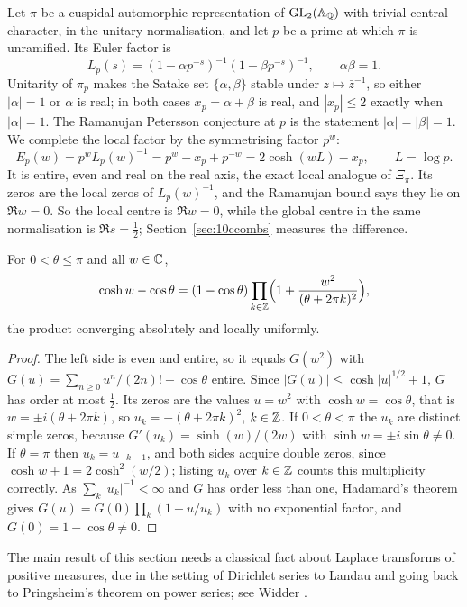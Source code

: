 Let $\pi$ be a cuspidal automorphic representation of $\mathrm{GL}_2(\mathbb{A}_{\mathbb{Q}})$ with trivial central character, in the unitary normalisation, and let $p$ be a prime at which $\pi$ is unramified. Its Euler factor is
\[
L_p(s)=(1-\alpha p^{-s})^{-1}(1-\beta p^{-s})^{-1},\qquad \alpha\beta=1 .
\]
Unitarity of $\pi_p$ makes the Satake set $\{\alpha,\beta\}$ stable under $z\mapsto\bar z^{-1}$, so either $|\alpha|=1$ or $\alpha$ is real; in both cases $x_p=\alpha+\beta$ is real, and $|x_p|\le2$ exactly when $|\alpha|=1$. The Ramanujan Petersson conjecture at $p$ is the statement $|\alpha|=|\beta|=1$. We complete the local factor by the symmetrising factor $p^w$:
\[
E_p(w)=p^{w}L_p(w)^{-1}=p^w-x_p+p^{-w}=2\cosh(wL)-x_p,\qquad L=\log p .
\]
It is entire, even and real on the real axis, the exact local analogue of $\Xi_\pi$. Its zeros are the local zeros of $L_p(w)^{-1}$, and the Ramanujan bound says they lie on $\Re w=0$. So the local centre is $\Re w=0$, while the global centre in the same normalisation is $\Re s=\frac12$; Section~\ref{sec:10ccombs} measures the difference.

\begin{lemma}\label{lem:10cproduct}
For $0<\theta\le\pi$ and all $w\in\mathbb{C}$,
\[
\cosh w-\cos\theta=(1-\cos\theta)\prod_{k\in\mathbb{Z}}\Bigl(1+\frac{w^2}{(\theta+2\pi k)^2}\Bigr),
\]
the product converging absolutely and locally uniformly.
\end{lemma}

\begin{proof}
The left side is even and entire, so it equals $G(w^2)$ with $G(u)=\sum_{n\ge0}u^n/(2n)!-\cos\theta$ entire. Since $|G(u)|\le\cosh|u|^{1/2}+1$, $G$ has order at most $\frac12$. Its zeros are the values $u=w^2$ with $\cosh w=\cos\theta$, that is $w=\pm i(\theta+2\pi k)$, so $u_k=-(\theta+2\pi k)^2$, $k\in\mathbb{Z}$. If $0<\theta<\pi$ the $u_k$ are distinct simple zeros, because $G'(u_k)=\sinh(w)/(2w)$ with $\sinh w=\pm i\sin\theta\ne0$. If $\theta=\pi$ then $u_k=u_{-k-1}$, and both sides acquire double zeros, since $\cosh w+1=2\cosh^2(w/2)$; listing $u_k$ over $k\in\mathbb{Z}$ counts this multiplicity correctly. As $\sum_k|u_k|^{-1}<\infty$ and $G$ has order less than one, Hadamard's theorem gives $G(u)=G(0)\prod_k(1-u/u_k)$ with no exponential factor, and $G(0)=1-\cos\theta\ne0$.
\end{proof}

The main result of this section needs a classical fact about Laplace transforms of positive measures, due in the setting of Dirichlet series to Landau \cite{landau1905} and going back to Pringsheim's theorem on power series; see Widder \cite{widder1941}.

